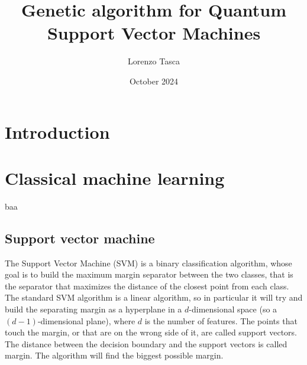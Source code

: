 \documentclass[a4paper]{article}
\title{Genetic algorithm for Quantum Support Vector Machines}
\author{Lorenzo Tasca}
\date{October 2024}
\begin{document}
\maketitle
\tableofcontents

\newpage


\section{Introduction}


\section{Classical machine learning}
baa
\subsection{Support vector machine}



The Support Vector Machine (SVM) is a binary classification algorithm, whose goal is to build the maximum margin separator between the two classes, that is the separator that maximizes the distance of the closest point from each class. The standard SVM algorithm is a linear algorithm, so in particular it will try and build the separating margin as a hyperplane in a $d$-dimensional space (so a $(d-1)$-dimensional plane), where $d$ is the number of features. The points that touch the margin, or that are on the wrong side of it, are called support vectors. The distance between the decision boundary and the support vectors is called margin. The algorithm will find the biggest possible margin. 
\end{document}

